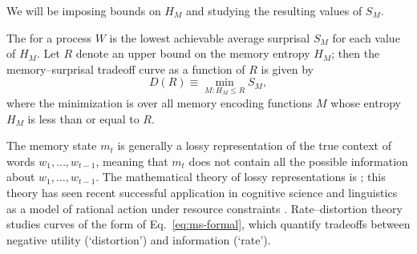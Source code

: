 We will be imposing bounds on $H_M$ and studying the resulting values of $S_M$. 

\begin{definition}
The  for a process $W$ is the lowest achievable average surprisal $S_M$ for each value of $H_M$. Let $R$ denote an upper bound on the memory entropy $H_M$; then the memory--surprisal tradeoff curve as a function of $R$ is given by
\begin{equation}
    \label{eq:ms-formal}
    D(R) \equiv \min_{M : H_M \le R} S_M,
\end{equation}
where the minimization is over all memory encoding functions $M$ whose entropy $H_M$ is less than or equal to $R$.
\end{definition}

The memory state $m_t$ is generally a lossy representation of the true context of words $w_1, \dots, w_{t-1}$, meaning that $m_t$ does not contain all the possible information about $w_1, \dots, w_{t-1}$. The mathematical theory of lossy representations is  \citep[for an overview and key results, see][pp. 301--347]{cover2006elements}; this theory has seen recent successful application in cognitive science and linguistics as a model of rational action under resource constraints \citep{brady2009compression,sims2012ideal,sims2018efficient,zaslavsky2018efficient,schach2018quantifying,zenon2019information,gershman2020origin}. 
Rate--distortion theory studies curves of the form of Eq.~\ref{eq:ms-formal}, which quantify tradeoffs between negative utility (`distortion') and information (`rate'). %



